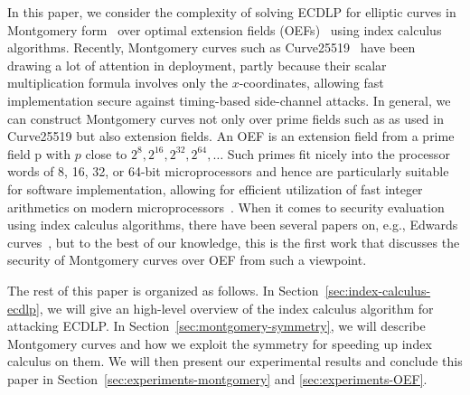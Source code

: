 In this paper, we consider the complexity of solving ECDLP for
elliptic curves in Montgomery form~\cite{1987-montgomery} over optimal
extension fields (OEFs)~\cite{DBLP:conf/crypto/BaileyP98} using index
calculus algorithms.
%
Recently, Montgomery curves such as
Curve25519~\cite{DBLP:conf/pkc/Bernstein06} have been drawing a lot of
attention in deployment, partly because their scalar multiplication
formula involves only the $x$-coordinates, allowing fast
implementation secure against timing-based side-channel attacks.
%
In general, we can construct Montgomery curves not only over prime
fields such as  as used in Curve25519 but also extension
fields.
%
An OEF is an extension field from a prime field \F p with $p$ close to
$2^8, 2^{16}, 2^{32}, 2^{64}, \ldots$
%
Such primes fit nicely into the processor words of 8, 16, 32, or
64-bit microprocessors and hence are particularly suitable for
software implementation, allowing for efficient utilization of fast
integer arithmetics on modern
microprocessors~\cite{DBLP:conf/crypto/BaileyP98}.
%
When it comes to security evaluation using index calculus algorithms,
there have been several papers on, e.g., Edwards
curves~\cite{DBLP:journals/joc/FaugereGHR14,DBLP:conf/indocrypt/GalbraithG14},
but to the best of our knowledge, this is the first work that
discusses the security of Montgomery curves over OEF from such a
viewpoint.

The rest of this paper is organized as follows.
%
In Section~\ref{sec:index-calculus-ecdlp}, we will give an high-level
overview of the index calculus algorithm for attacking ECDLP.
%
In Section~\ref{sec:montgomery-symmetry}, we will describe Montgomery
curves and how we exploit the symmetry for speeding up index calculus
on them.
%
We will then present our experimental results and conclude this paper
in Section~\ref{sec:experiments-montgomery} and
\ref{sec:experiments-OEF}.
